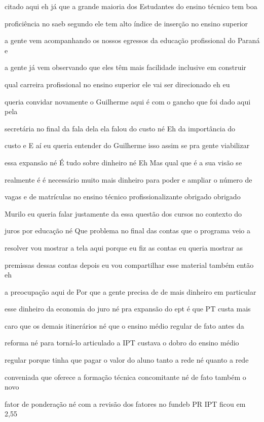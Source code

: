 \documentclass[a4paper,12pt]{article}
\begin{document}
citado aqui eh já que a grande maioria dos Estudantes do ensino técnico tem boa

proficiência no saeb segundo ele tem alto índice de inserção no ensino superior

a gente vem acompanhando os nossos egressos da educação profissional do Paraná e

a gente já vem observando que eles têm mais facilidade inclusive em construir

qual carreira profissional no ensino superior ele vai ser direcionado eh eu

queria convidar novamente o Guilherme aqui é com o gancho que foi dado aqui pela

secretária no final da fala dela ela falou do custo né Eh da importância do

custo e E aí eu queria entender do Guilherme isso assim se pra gente viabilizar

essa expansão né É tudo sobre dinheiro né Eh Mas qual que é a sua visão se

realmente é é necessário muito mais dinheiro para poder e ampliar o número de

vagas e de matrículas no ensino técnico profissionalizante obrigado obrigado

Murilo eu queria falar justamente da essa questão dos cursos no contexto do

juros por educação né Que problema no final das contas que o programa veio a

resolver vou mostrar a tela aqui porque eu fiz as contas eu queria mostrar as

premissas dessas contas depois eu vou compartilhar esse material também então eh

a preocupação aqui de Por que a gente precisa de de mais dinheiro em particular

esse dinheiro da economia do juro né pra expansão do ept é que PT custa mais

caro que os demais itinerários né que o ensino médio regular de fato antes da

reforma né para torná-lo articulado a IPT custava o dobro do ensino médio

regular porque tinha que pagar o valor do aluno tanto a rede né quanto a rede

conveniada que oferece a formação técnica concomitante né de fato também o novo

fator de ponderação né com a revisão dos fatores no fundeb PR IPT ficou em 2,55
\end{document}
